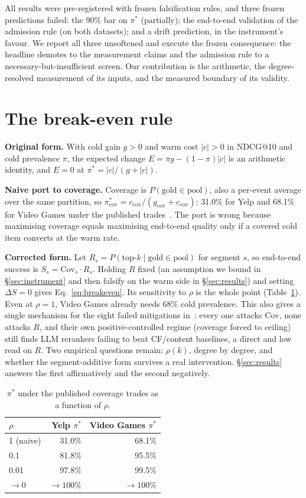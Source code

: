 \documentclass[sigconf,anonymous,review]{acmart}
\begin{document}
All results were pre-registered with frozen falsification rules, and three frozen predictions failed: the 90\% bar on $\pi^*$ (partially); the end-to-end validation of the admission rule (on both datasets); and a drift prediction, in the instrument's favour. We report all three unsoftened and execute the frozen consequence: the headline demotes to the measurement claims and the admission rule to a necessary-but-insufficient screen. Our contribution is the arithmetic, the degree-resolved measurement of its inputs, and the measured boundary of its validity.

\section{The break-even rule}
\textbf{Original form.} With cold gain $g>0$ and warm cost $|c|>0$ in NDCG@10 and cold prevalence $\pi$, the expected change $E=\pi g-(1-\pi)|c|$ is an arithmetic identity, and $E=0$ at $\pi^*=|c|/(g+|c|)$.

\textbf{Naive port to coverage.} Coverage is $P(\text{gold}\in\text{pool})$, also a per-event average over the same partition, so $\pi^*_{\mathrm{cov}}=c_{\mathrm{cov}}/(g_{\mathrm{cov}}+c_{\mathrm{cov}})$: 31.0\% for Yelp and 68.1\% for Video Games under the published trades~\cite{bottleneck}. The port is wrong because maximising coverage equals maximising end-to-end quality only if a covered cold item converts at the warm rate.

\textbf{Corrected form.} Let $R_s=P(\text{top-}k\mid\text{gold}\in\text{pool})$ for segment $s$, so end-to-end success is $S_s=\mathrm{Cov}_s\cdot R_s$. Holding $R$ fixed (an assumption we bound in \S\ref{sec:instrument} and then falsify on the warm side in \S\ref{sec:results}) and setting $\Delta S=0$ gives Eq.~\ref{eq:breakeven}. Its sensitivity to $\rho$ is the whole point (Table~\ref{tab:rho}). Even at $\rho=1$, Video Games already needs 68\% cold prevalence. This also gives a single mechanism for the eight failed mitigations in~\cite{bottleneck}: every one attacks $\mathrm{Cov}$, none attacks $R$, and their own positive-controlled regime (coverage forced to ceiling) still finds LLM rerankers failing to beat CF/content baselines, a direct and low read on $R$. Two empirical questions remain: $\rho(k)$, degree by degree, and whether the segment-additive form survives a real intervention. \S\ref{sec:results} answers the first affirmatively and the second negatively.

\begin{table}[t]
\caption{$\pi^*$ under the published coverage trades as a function of $\rho$.}
\label{tab:rho}
\small
\begin{tabular}{lrr}
\toprule
$\rho$ & Yelp $\pi^*$ & Video Games $\pi^*$\\
\midrule
1 (naive) & 31.0\% & 68.1\%\\
0.1 & 81.8\% & 95.5\%\\
0.01 & 97.8\% & 99.5\%\\
$\to 0$ & $\to 100\%$ & $\to 100\%$\\
\bottomrule
\end{tabular}
\end{table}
\end{document}
